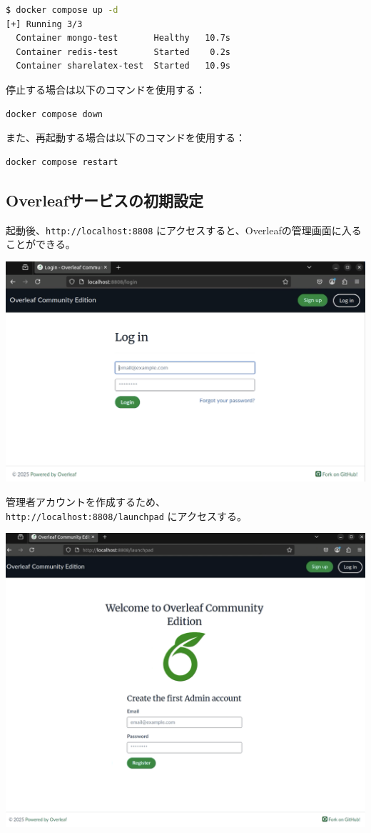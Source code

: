 \begin{lstlisting}[language=bash]
$ docker compose up -d
[+] Running 3/3
  Container mongo-test       Healthy   10.7s
  Container redis-test       Started    0.2s
  Container sharelatex-test  Started   10.9s
\end{lstlisting}

停止する場合は以下のコマンドを使用する：

\begin{lstlisting}[language=bash]
docker compose down
\end{lstlisting}

また、再起動する場合は以下のコマンドを使用する：

\begin{lstlisting}[language=bash]
docker compose restart
\end{lstlisting}

\subsection{Overleafサービスの初期設定}

起動後、\texttt{http://localhost:8808} にアクセスすると、Overleafの管理画面に入ることができる。

\includegraphics[width=0.8\linewidth]{images/Pasted image 20250307155416.png}

管理者アカウントを作成するため、\\ \texttt{http://localhost:8808/launchpad} にアクセスする。

\includegraphics[width=0.8\linewidth]{images/Pasted image 20250307160444.png}


